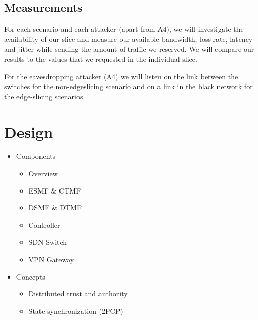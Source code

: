 \documentclass{article}
\begin{document}

\subsection{Measurements}
For each scenario and each attacker (apart from A4), we will investigate the availability of our slice and measure our available bandwidth, loss rate, latency and jitter while sending the amount of traffic we reserved. We will compare our results to the values that we requested in the individual slice.

For the eavesdropping attacker (A4) we will listen on the link between the switches for the non-edgeslicing scenario and on a link in the black network for the edge-slicing scenarios.

\section{Design}
\begin{itemize}
    \item Components
    \begin{itemize}
        \item Overview
        \item ESMF \& CTMF
        \item DSMF \& DTMF
        \item Controller
        \item SDN Switch
        \item VPN Gateway
    \end{itemize}
    \item Concepts
    \begin{itemize}
        \item Distributed trust and authority
        \item State synchronization (2PCP)
    \end{itemize}
\end{itemize}
\end{document}
